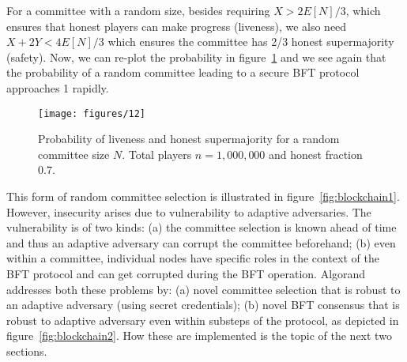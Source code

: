 \documentclass{article}
\begin{document}
For a committee with a random size, besides requiring $X> 2E[N]/3$, which ensures that honest players can make progress (liveness), we also need $X+2Y<4E[N]/3$ which ensures the committee has 2/3 honest supermajority (safety). Now, we can re-plot the probability in figure~\ref{fig:2} and we see again that the probability of a random committee leading to a secure BFT protocol approaches 1 rapidly.

\begin{figure}[htb]
    \centering
    \texttt{[image: figures/12]}
    \caption{Probability of liveness and honest supermajority for a random committee size $N$. Total players $n=1,000,000$ and honest fraction $0.7$.}
    \label{fig:2}
\end{figure}




This form of random committee selection is illustrated in figure~\ref{fig:blockchain1}. However, insecurity arises due to vulnerability to adaptive adversaries.  The  vulnerability is of two kinds: (a) the  committee selection is known ahead of time and thus an adaptive adversary can corrupt the committee beforehand;  (b) even within a committee, individual nodes have specific roles in the context of the BFT protocol and can get corrupted during the BFT operation.  
Algorand addresses both these problems by: (a) novel committee selection that is robust to an  adaptive adversary (using secret credentials);  (b) novel BFT consensus that is robust to adaptive adversary even within substeps of the protocol, as depicted in figure~\ref{fig:blockchain2}. How these are implemented  is the topic of the next two sections. 
\end{document}
